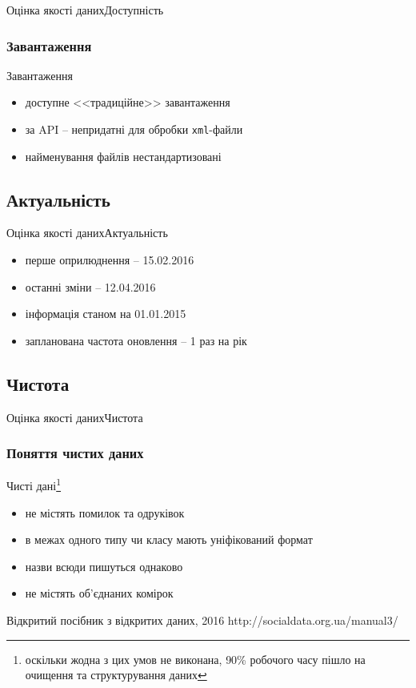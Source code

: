 \documentclass[12pt, aspectratio=1610]{beamer}
\begin{document}
\begin{frame}{Оцінка якості даних}{Доступність}
	\subsubsection{Завантаження}
	\begin{block}{Завантаження}
		\begin{itemize}
			\item доступне <<традиційне>> завантаження
			\item за API -- непридатні для обробки {\tt xml}-файли
			\item найменування файлів нестандартизовані
		\end{itemize} 
	\end{block}
\end{frame}

\subsection{Актуальність}
\begin{frame}{Оцінка якості даних}{Актуальність}
	\begin{itemize}
			\item перше оприлюднення -- 15.02.2016
			\item останні зміни -- 12.04.2016
			\item інформація станом на \alert{01.01.2015}
			\item запланована частота оновлення -- 1 раз на рік
	\end{itemize} 
\end{frame}

\subsection{Чистота}
\begin{frame}{Оцінка якості даних}{Чистота}
	\subsubsection{Поняття чистих даних}	
	\begin{block}{Чисті дані\footnote{оскільки \alert{жодна} з цих умов не виконана, \alert{90\%} робочого часу пішло на очищення та структурування даних}}
	\begin{itemize}
		\item не містять помилок та одруківок
		\item в межах одного типу чи класу мають уніфікований формат
		\item назви всюди пишуться однаково
		\item не містять об'єднаних комірок
	\end{itemize}
\quoteTitle{}%
{Відкритий посібник з відкритих даних, 2016}%
{http://socialdata.org.ua/manual3/}
\end{block}
\end{frame}
\end{document}
